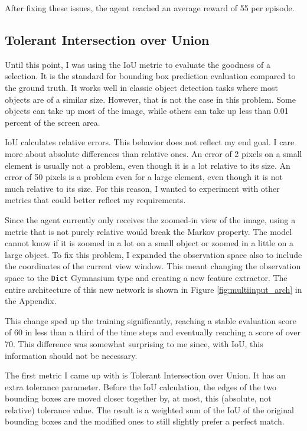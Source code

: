 \documentclass[
  digital,     %
  oneside,     %
  nosansbold,  %
  nocolorbold, %
  lof,         %
  lot,         %
]{fithesis4}
\begin{document}
After fixing these issues, the agent reached an average reward of 55 per episode.

\subsection{Tolerant Intersection over Union}
\label{subsec:eval_metric}

Until this point, I was using the IoU metric to evaluate the goodness of a selection. It is the standard for bounding box prediction evaluation compared to the ground truth. It works well in classic object detection tasks where most objects are of a similar size. However, that is not the case in this problem. Some objects can take up most of the image, while others can take up less than 0.01 percent of the screen area.

IoU calculates relative errors. This behavior does not reflect my end goal. I care more about absolute differences than relative ones. An error of 2 pixels on a small element is usually not a problem, even though it is a lot relative to its size. An error of 50 pixels is a problem even for a large element, even though it is not much relative to its size. For this reason, I wanted to experiment with other metrics that could better reflect my requirements.

Since the agent currently only receives the zoomed-in view of the image, using a metric that is not purely relative would break the Markov property. The model cannot know if it is zoomed in a lot on a small object or zoomed in a little on a large object. To fix this problem, I expanded the observation space also to include the coordinates of the current view window. This meant changing the observation space to the \texttt{Dict} Gymnasium type and creating a new feature extractor. The entire architecture of this new network is shown in Figure \ref{fig:multiinput_arch} in the Appendix.

This change sped up the training significantly, reaching a stable evaluation score of 60 in less than a third of the time steps and eventually reaching a score of over 70. This difference was somewhat surprising to me since, with IoU, this information should not be necessary.

The first metric I came up with is Tolerant Intersection over Union. It has an extra tolerance parameter. Before the IoU calculation, the edges of the two bounding boxes are moved closer together by, at most, this (absolute, not relative) tolerance value. The result is a weighted sum of the IoU of the original bounding boxes and the modified ones to still slightly prefer a perfect match.
\end{document}
